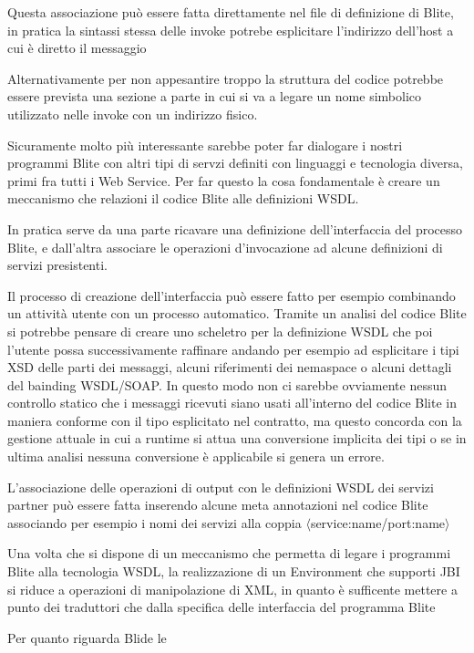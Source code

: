 Questa associazione può essere fatta direttamente nel file di definizione di
Blite, in pratica la sintassi stessa delle invoke potrebe esplicitare
l'indirizzo dell'host a cui è diretto il messaggio


Alternativamente per non appesantire troppo la struttura del codice potrebbe
essere prevista una sezione a parte in cui si va a legare un nome simbolico utilizzato
nelle invoke con un indirizzo fisico.

Sicuramente molto più interessante sarebbe poter far dialogare i nostri
programmi Blite con altri tipi di servzi definiti con linguaggi e tecnologia
diversa, primi fra tutti i Web Service. Per far questo la cosa fondamentale è
creare un meccanismo che relazioni il codice Blite alle definizioni WSDL.

In pratica serve da una parte ricavare una definizione dell'interfaccia del
processo Blite, e dall'altra associare le operazioni d'invocazione ad alcune
definizioni di servizi presistenti.

Il processo di creazione dell'interfaccia può essere fatto per esempio
combinando un attività utente con un processo automatico.
Tramite un analisi del codice Blite si potrebbe pensare di creare uno
scheletro per la definizione WSDL che poi l'utente possa successivamente
raffinare andando per esempio ad esplicitare i tipi XSD delle parti dei
messaggi, alcuni riferimenti dei nemaspace o alcuni dettagli del bainding
WSDL/SOAP. In questo modo non ci sarebbe ovviamente nessun controllo statico che
i messaggi ricevuti siano usati all'interno del codice Blite in maniera conforme
con il tipo esplicitato nel contratto, ma questo concorda con la gestione
attuale in cui a runtime si attua una conversione implicita dei tipi o se in
ultima analisi nessuna conversione è applicabile si genera un errore.

L'associazione delle operazioni di output con le definizioni WSDL dei servizi
partner può essere fatta inserendo alcune meta annotazioni nel codice Blite
associando per esempio i nomi dei servizi alla coppia
$\langle$service:name/port:name$\rangle$

Una volta che si dispone di un meccanismo che permetta di legare i programmi Blite
alla tecnologia WSDL, la realizzazione di un Environment che supporti JBI si
riduce a operazioni di manipolazione di XML, in quanto è sufficente mettere a
punto dei traduttori che dalla specifica delle interfaccia del programma Blite 


Per quanto riguarda Blide le





